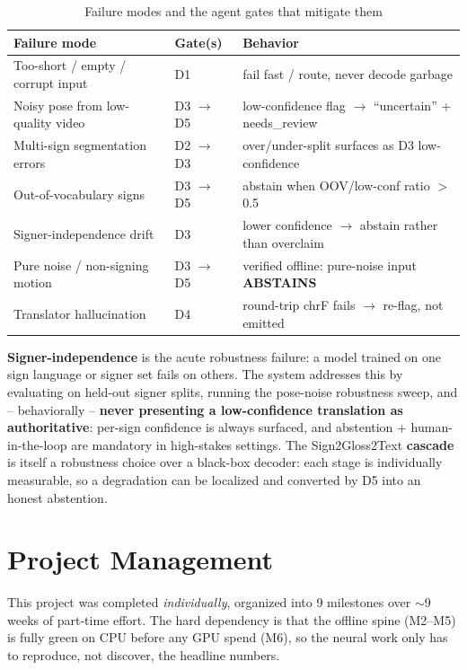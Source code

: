 \documentclass[12pt,a4paper]{article}
\begin{document}
\begin{table}[H]
\centering
\caption{Failure modes and the agent gates that mitigate them}
\small
\begin{tabularx}{\linewidth}{@{} L l L @{}}
\toprule
\textbf{Failure mode} & \textbf{Gate(s)} & \textbf{Behavior} \\
\midrule
Too-short / empty / corrupt input & D1 & fail fast / route, never decode garbage \\
Noisy pose from low-quality video & D3 $\rightarrow$ D5 & low-confidence flag $\rightarrow$ ``uncertain'' + needs\_review \\
Multi-sign segmentation errors & D2 $\rightarrow$ D3 & over/under-split surfaces as D3 low-confidence \\
Out-of-vocabulary signs & D3 $\rightarrow$ D5 & abstain when OOV/low-conf ratio $>$ 0.5 \\
Signer-independence drift & D3 & lower confidence $\rightarrow$ abstain rather than overclaim \\
Pure noise / non-signing motion & D3 $\rightarrow$ D5 & verified offline: pure-noise input \textbf{ABSTAINS} \\
Translator hallucination & D4 & round-trip chrF fails $\rightarrow$ re-flag, not emitted \\
\bottomrule
\end{tabularx}
\end{table}

\textbf{Signer-independence} is the acute robustness failure: a model trained on one sign language or signer set fails on others. The system addresses this by evaluating on held-out signer splits, running the pose-noise robustness sweep, and -- behaviorally -- \textbf{never presenting a low-confidence translation as authoritative}: per-sign confidence is always surfaced, and abstention + human-in-the-loop are mandatory in high-stakes settings. The Sign2Gloss2Text \textbf{cascade} is itself a robustness choice over a black-box decoder: each stage is individually measurable, so a degradation can be localized and converted by D5 into an honest abstention.

\section{Project Management}

This project was completed \textit{individually}, organized into 9 milestones over $\sim$9 weeks of part-time effort. The hard dependency is that the offline spine (M2--M5) is fully green on CPU before any GPU spend (M6), so the neural work only has to reproduce, not discover, the headline numbers.
\end{document}
